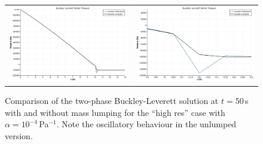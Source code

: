 \documentclass[]{scrreprt}
\begin{document}
\begin{figure}[htb]
\centering
\begin{tabular}{cc}
\includegraphics[width=7cm]{bl_lumped_unlumped.eps} &
\includegraphics[width=7cm]{bl_lumped_unlumped_zoom.eps}
\end{tabular}
\caption{Comparison of the two-phase Buckley-Leverett solution at
  $t=50$\,s with and without mass lumping for the ``high res'' case
  with $\alpha = 10^{-4}$\,Pa$^{-1}$.  Note the oscillatory
  behaviour in the unlumped version.}
\label{bl_lump.fig}
\end{figure}
\end{document}
